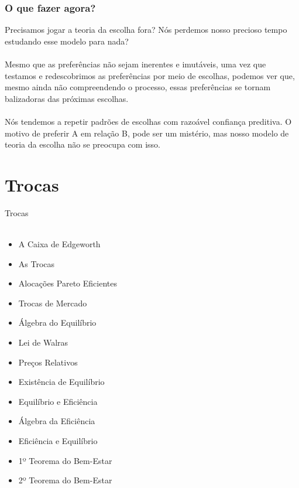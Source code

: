 \documentclass{beamer}[10]
\begin{document}
\begin{frame}
	\frametitle{O que fazer agora?}

	Precisamos jogar a teoria da escolha fora? 	Nós perdemos nosso precioso tempo estudando esse modelo para nada? 
	\\~\\
	Mesmo que as preferências não sejam inerentes e imutáveis, uma vez que testamos e redescobrimos as preferências por meio de escolhas, podemos ver que, mesmo ainda não compreendendo o processo, essas preferências se tornam balizadoras das próximas escolhas. 
	\\~\\
	Nós tendemos a repetir padrões de escolhas com razoável confiança preditiva. O motivo de preferir A em relação B, pode ser um mistério, mas nosso modelo de teoria da escolha não se preocupa com isso.

\end{frame}

\section[Trocas]{Trocas}
\begin{frame}
	\huge Trocas \normalsize
	\\~\\
	\begin{multicols*}{2}		
	\begin{itemize}
		\item A Caixa de Edgeworth
		\item As Trocas
		\item Alocações Pareto Eficientes
		\item Trocas de Mercado
		\item Álgebra do Equilíbrio
		\item Lei de Walras
		\item Preços Relativos
		\item Existência de Equilíbrio
		\item Equilíbrio e Eficiência
		\item Álgebra da Eficiência
		\item Eficiência e Equilíbrio
		\item 1º Teorema do Bem-Estar
		\item 2º Teorema do Bem-Estar
	\end{itemize}
\end{multicols*}
\end{frame}
\end{document}
